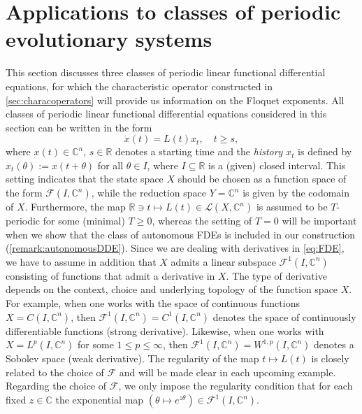 \documentclass[english]{myarticle}
\begin{document}
\begin{sloppypar}
\section{Applications to classes of periodic evolutionary systems} \label{sec:applications}
This section discusses three classes of periodic linear functional differential equations, for which the characteristic operator constructed in \cref{sec:characoperators} will provide us information on the Floquet exponents. All classes of periodic linear functional differential equations considered in this section can be written in the form
\begin{equation} \label{eq:FDE} \tag{FDE}
    \dot{x}(t) = L(t)x_t, \quad t \geq s,
\end{equation}
where $x(t) \in \mathbb{C}^n$, $s \in \mathbb{R}$ denotes a starting time and the \emph{history} $x_t$ is defined by $x_t(\theta) := x(t+\theta)$ for all $\theta \in I$, where $I \subseteq \mathbb{R}$ is a (given) closed interval. This setting indicates that the state space $X$ should be chosen as a function space of the form $\mathcal{F}(I,\mathbb{C}^n)$, while the reduction space $Y = \mathbb{C}^n$ is given by the codomain of $X$. Furthermore, the map $\mathbb{R} \ni t \mapsto L(t) \in \mathcal{L}(X,\mathbb{C}^n)$ is assumed to be $T$-periodic for some (minimal) $T \geq 0$, whereas the setting of $T=0$ will be important when we show that the class of autonomous FDEs is included in our construction (\cref{remark:autonomousDDE}). Since we are dealing with derivatives in \eqref{eq:FDE}, we have to assume in addition that $X$ admits a linear subspace $\mathcal{F}^1(I,\mathbb{C}^n)$ consisting of functions that admit a derivative in $X$. The type of derivative depends on the context, choice and underlying topology of the function space $X$. For example, when one works with the space of continuous functions $X = C(I,\mathbb{C}^n)$, then $\mathcal{F}^1(I,\mathbb{C}^n) = C^1(I,\mathbb{C}^n)$ denotes the space of continuously differentiable functions (strong derivative). Likewise, when one works with $X = L^p(I,\mathbb{C}^n)$ for some $1 \leq p \leq \infty$, then $\mathcal{F}^1(I,\mathbb{C}^n) = W^{1,p}(I,\mathbb{C}^n)$ denotes a Sobolev space (weak derivative). The regularity of the map $t \mapsto L(t)$ is closely related to the choice of $\mathcal{F}$ and will be made clear in each upcoming example. Regarding the choice of $\mathcal{F}$, we only impose the regularity condition that for each fixed $z \in \mathbb{C}$ the exponential map $(\theta \mapsto e^{z\theta}) \in \mathcal{F}^{1}(I,\mathbb{C}^n)$.


\end{sloppypar}
\end{document}
